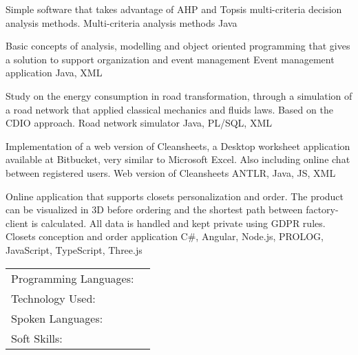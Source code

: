 \documentclass[]{awesome-cv}
\begin{document}
\vspace{-5mm}
\begin{cventries}
 	\cventry
	{Simple software that takes advantage of AHP and Topsis multi-criteria decision analysis methods.}
	{Multi-criteria analysis methods}
	{Java}
	{}
	{}
	
	\vspace{-5mm}
	\cventry
	{Basic concepts of analysis, modelling and object oriented programming 
	that gives a solution to support organization and event management}
	{Event management application}
	{Java, XML}
	{}
	{}
	
	\vspace{-5mm}
	\cventry
	{Study on the energy consumption in road
	transformation, through a simulation of a road network that
	applied classical mechanics and fluids laws. Based on the CDIO approach.}
	{Road network simulator}
	{Java, PL/SQL, XML}
	{}
	{}
	
	\vspace{-5mm}
	\cventry
	{Implementation of a web version of Cleansheets, a Desktop worksheet application available at Bitbucket,
	very similar to Microsoft Excel. Also including online chat between registered users.}
	{Web version of Cleansheets}
	{ANTLR, Java, JS, XML}
	{}
	{}

	\vspace{-5mm}
	\cventry
	{Online application that supports closets personalization and order.
	 The product can be visualized in 3D before ordering and the shortest path 
	 between factory-client is calculated. All data is handled and kept private using GDPR rules.}
	{Closets conception and order application}
	{C\#, Angular, Node.js, PROLOG, JavaScript, TypeScript, Three.js}
	{}
	{}
\end{cventries}

\vspace{-2mm}
\begin{cventries}
	\vspace{-2mm}
	\cventry
	{}
	{\def\arraystretch{1.15}{\begin{tabular}{ l l }
		Programming Languages:  & {\skill{ Java, JavaScript, C\#, PROLOG }} \\
		Technology Used:  & {\skill{ Angular, Node.js, .NET Core, Jira, Git, SonarQube, Jenkins, Oracle, Maven}} \\
		Spoken Languages:  & {\skill{ English, Portuguese, French, Spanish}} \\
		Soft Skills:  & {\skill{ Team work, Self-motivation, Creativity, Good communication}} \\
		\end{tabular}}}
	{}
	{}
	{}
\end{cventries}
\end{document}

